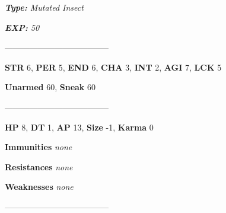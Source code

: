 \documentclass[11pt,a4paper,twocolumn]{book}
\begin{document}
	\noindent
	\emph{\textbf{Type:} Mutated Insect}
	
	\noindent
	\emph{\textbf{EXP:} 50}
	
%		
%	
%		

	--------------------------------------
	
	\noindent
	\textbf{STR} 6, \textbf{PER} 5, \textbf{END} 6, \textbf{CHA} 3, \textbf{INT} 2, \textbf{AGI} 7, \textbf{LCK} 5
	
	\noindent
	\textbf{Unarmed} 60, \textbf{Sneak} 60
	
	--------------------------------------
	
	\noindent
	\textbf{HP} 8, \textbf{DT} 1, \textbf{AP} 13, \textbf{Size} -1, \textbf{Karma} 0
	
	
	\noindent
	\textbf{Immunities} \emph{none} %
	
	\noindent
	\textbf{Resistances} \emph{none} %
	
	\noindent
	\textbf{Weaknesses} \emph{none} %
	
	--------------------------------------	
	
\end{document}
